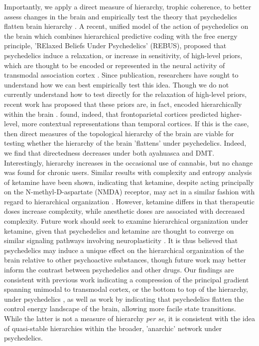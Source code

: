 Importantly, we apply a direct measure of hierarchy, trophic coherence, to better assess changes in the brain and empirically test the theory that psychedelics flatten brain hierarchy \parencite{Carhart-Harris2019a}. A recent, unified model of the action of psychedelics on the brain which combines hierarchical predictive coding with the free energy principle, 'RElaxed Beliefs Under Psychedelics' (REBUS), proposed that psychedelics induce a relaxation, or increase in sensitivity, of high-level priors, which are thought to be encoded or represented in the neural activity of transmodal association cortex \parencite{Friston2010, Carhart-Harris2019a}. Since publication, researchers have sought to understand how we can best empirically test this idea. Though we do not currently understand how to test directly for the relaxation of high-level priors, recent work has proposed that these priors are, in fact, encoded hierarchically within the brain \parencite{Brodski-Guerniero2017}. \textcite{Caucheteux2023} found, indeed, that frontoparietal cortices predicted higher-level, more contextual representations than temporal cortices. If this is the case, then
direct measures of the topological hierarchy of the brain are viable for testing whether the hierarchy of the brain
'flattens' under psychedelics. Indeed, we find that directedness decreases under both ayahuasca and DMT. Interestingly,
hierarchy increases in the occasional use of cannabis, but no change was found for chronic users. 
Similar
results with complexity and entropy analysis of ketamine have been shown, indicating that ketamine, despite acting
principally on the N-methyl-D-aspartate (NMDA) receptor, may act in a similar fashion with regard to hierarchical
organization \parencite{Roy2021, Sarasso2015, Farnes2020, Wang2017}. However, ketamine differs in that
therapeutic doses increase complexity, while anesthetic doses are associated with decreased complexity. Future work
should seek to examine hierarchical organization under ketamine, given that psychedelics and ketamine are
thought to converge on similar signaling pathways involving neuroplasticity \parencite{Aleksandrova2021}. It is thus believed that psychedelics
may induce a unique effect on the hierarchical organization of the brain relative to other psychoactive substances,
though future work may better inform the contrast between psychedelics and other drugs. Our findings are consistent with previous work indicating a compression of the principal gradient spanning unimodal to transmodal cortex, or the bottom to top of the hierarchy, under psychedelics \parencite{Girn2022}, as well as work by \textcite{Singleton2022} indicating that psychedelics flatten the control energy landscape of the brain, allowing more facile state transitions. While the latter
is not a measure of hierarchy \textit{per se}, it is consistent with the idea of quasi-stable hierarchies within
the broader, 'anarchic' network under psychedelics.

